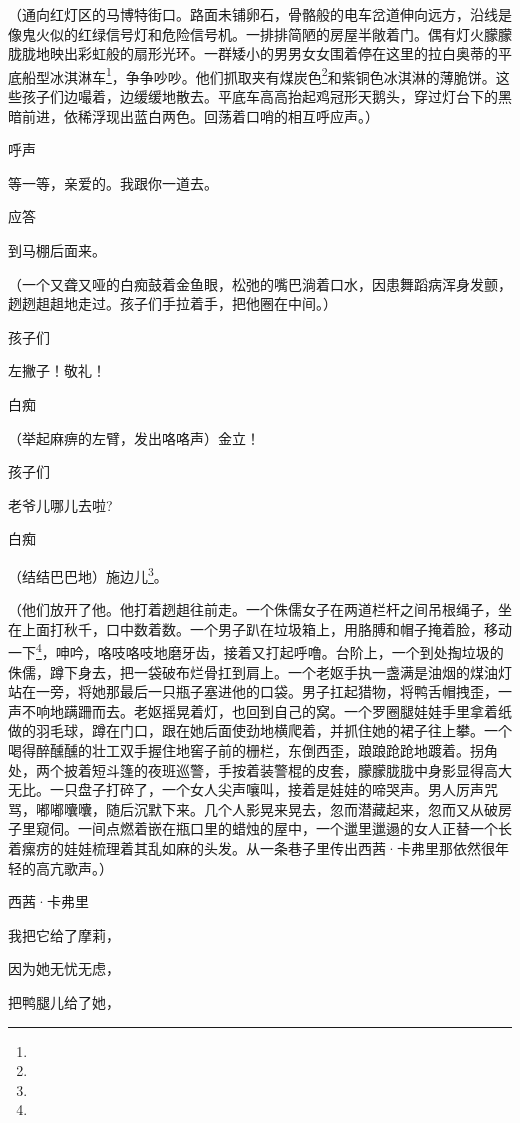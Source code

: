 \par （通向红灯区的马博特街口。路面未铺卵石，骨骼般的电车岔道伸向远方，沿线是像鬼火似的红绿信号灯和危险信号机。一排排简陋的房屋半敞着门。偶有灯火朦朦胧胧地映出彩虹般的扇形光环。一群矮小的男男女女围着停在这里的拉白奥蒂的平底船型冰淇淋车\footnote{}，争争吵吵。他们抓取夹有煤炭色\footnote{}和紫铜色冰淇淋的薄脆饼。这些孩子们边嘬着，边缓缓地散去。平底车高高抬起鸡冠形天鹅头，穿过灯台下的黑暗前进，依稀浮现出蓝白两色。回荡着口哨的相互呼应声。）
\par 呼声
\par 等一等，亲爱的。我跟你一道去。
\par 应答
\par 到马棚后面来。
\par （一个又聋又哑的白痴鼓着金鱼眼，松弛的嘴巴淌着口水，因患舞蹈病浑身发颤，趔趔趄趄地走过。孩子们手拉着手，把他圈在中间。）
\par 孩子们
\par 左撇子！敬礼！
\par 白痴
\par （举起麻痹的左臂，发出咯咯声）金立！
\par 孩子们
\par 老爷儿哪儿去啦?
\par 白痴
\par （结结巴巴地）施边儿\footnote{}。
\par （他们放开了他。他打着趔趄往前走。一个侏儒女子在两道栏杆之间吊根绳子，坐在上面打秋千，口中数着数。一个男子趴在垃圾箱上，用胳膊和帽子掩着脸，移动一下\footnote{}，呻吟，咯吱咯吱地磨牙齿，接着又打起呼噜。台阶上，一个到处掏垃圾的侏儒，蹲下身去，把一袋破布烂骨扛到肩上。一个老妪手执一盏满是油烟的煤油灯站在一旁，将她那最后一只瓶子塞进他的口袋。男子扛起猎物，将鸭舌帽拽歪，一声不响地蹒跚而去。老妪摇晃着灯，也回到自己的窝。一个罗圈腿娃娃手里拿着纸做的羽毛球，蹲在门口，跟在她后面使劲地横爬着，并抓住她的裙子往上攀。一个喝得醉醺醺的壮工双手握住地窖子前的栅栏，东倒西歪，踉踉跄跄地踱着。拐角处，两个披着短斗篷的夜班巡警，手按着装警棍的皮套，朦朦胧胧中身影显得高大无比。一只盘子打碎了，一个女人尖声嚷叫，接着是娃娃的啼哭声。男人厉声咒骂，嘟嘟囔囔，随后沉默下来。几个人影晃来晃去，忽而潜藏起来，忽而又从破房子里窥伺。一间点燃着嵌在瓶口里的蜡烛的屋中，一个邋里邋遢的女人正替一个长着瘰疠的娃娃梳理着其乱如麻的头发。从一条巷子里传出西茜·卡弗里那依然很年轻的高亢歌声。）
\par 西茜·卡弗里
\par 我把它给了摩莉，
\par 因为她无忧无虑，
\par 把鸭腿儿给了她，
